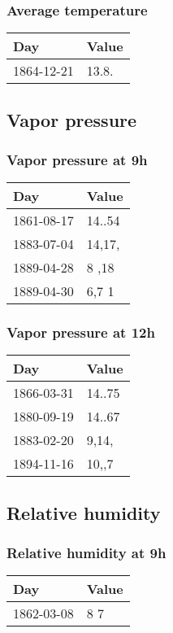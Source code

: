 \documentclass[]{article}
\begin{document}
\subsubsection{Average temperature}\label{average-temperature}

\begin{longtable}[]{@{}ll@{}}
\toprule
Day & Value\tabularnewline
\midrule
\endhead
1864-12-21 & 13.8.\tabularnewline
\bottomrule
\end{longtable}

\subsection{Vapor pressure}\label{vapor-pressure}

\subsubsection{Vapor pressure at 9h}\label{vapor-pressure-at-9h}

\begin{longtable}[]{@{}ll@{}}
\toprule
Day & Value\tabularnewline
\midrule
\endhead
1861-08-17 & 14..54\tabularnewline
1883-07-04 & 14,17,\tabularnewline
1889-04-28 & 8 ,18\tabularnewline
1889-04-30 & 6,7 1\tabularnewline
\bottomrule
\end{longtable}

\subsubsection{Vapor pressure at 12h}\label{vapor-pressure-at-12h}

\begin{longtable}[]{@{}ll@{}}
\toprule
Day & Value\tabularnewline
\midrule
\endhead
1866-03-31 & 14..75\tabularnewline
1880-09-19 & 14..67\tabularnewline
1883-02-20 & 9,14,\tabularnewline
1894-11-16 & 10,,7\tabularnewline
\bottomrule
\end{longtable}

\subsection{Relative humidity}\label{relative-humidity}

\subsubsection{Relative humidity at 9h}\label{relative-humidity-at-9h}

\begin{longtable}[]{@{}ll@{}}
\toprule
Day & Value\tabularnewline
\midrule
\endhead
1862-03-08 & 8 7\tabularnewline
\bottomrule
\end{longtable}
\end{document}
